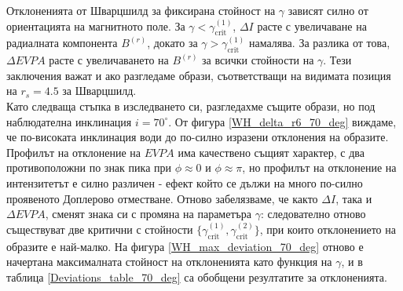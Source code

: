 Отклоненията от Шварцшилд за фиксирана стойност на $\gamma$ зависят силно от ориентацията на магнитното поле. За $\gamma < \gamma_\text{crit}^{(1)}$, $\Delta I$ расте с увеличаване на радиалната компонента $B^{(r)}$, докато за $\gamma > \gamma_\text{crit}^{(1)}$ намалява. За разлика от това, $\Delta EVPA$ расте с увеличаването на $B^{(r)}$ за всички стойности на $\gamma$. Тези заключения важат и ако разгледаме образи, съответстващи на видимата позиция на $r_s = 4.5$ за Шварцшилд.\\

Като следваща стъпка в изследването си, разгледахме същите образи, но под наблюдателна инклинация $i = 70^\circ$. От фигура \ref{WH_delta_r6_70_deg} виждаме, че по-високата инклинация води до по-силно изразени отклонения на образите. Профилът на отклонение на $EVPA$ има качествено същият характер, с два противоположни по знак пика при $\phi \approx 0$ и $\phi \approx \pi$, но профилът на отклонение на интензитетът е силно различен - ефект който се дължи на много по-силно проявеното Доплерово отместване. Отново забелязваме, че както $\Delta I$, така и $\Delta EVPA$, сменят знака си с промяна на параметъра $\gamma$: следователно отново съществуват две критични с стойности $\{\gamma_\text{crit}^{(1)}, \gamma_\text{crit}^{(2)}\}$, при които отклонението на образите е най-малко. На фигура \ref{WH_max_deviation_70_deg} отново е начертана максималната стойност на отклоненията като функция на $\gamma$, и в таблица \ref{Deviations_table_70_deg} са обобщени резултатите за отклоненията. \newpage

